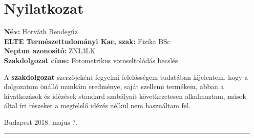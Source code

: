 \documentclass[12pt,letterpaper,twoside,openright]{book}
\begin{document}
\chapter*{Nyilatkozat}

\noindent
\textbf{Név:} Horváth Bendegúz
\\
\textbf{ELTE Természettudományi Kar, szak:} Fizika BSc
\\
\textbf{Neptun azonosító:} ZNL3LK\\
\textbf{Szakdolgozat címe:} Fotometrikus vöröseltolódás becslés
\vspace*{2cm}    

A    \textbf{szakdolgozat}   szerzőjeként    fegyelmi
felelősségem  tudatában kijelentem,  hogy a  dolgozatom  önálló munkám
eredménye, saját  szellemi termékem, abban a  hivatkozások és idézések
standard  szabályait  következetesen   alkalmaztam,  mások  által  írt
részeket a megfelelő idézés nélkül nem használtam fel.

\vspace*{2cm}
Budapest 2018. majus ?.
\\
\hspace*{8 cm}\rule{5cm}{0.5pt}
\end{document}
